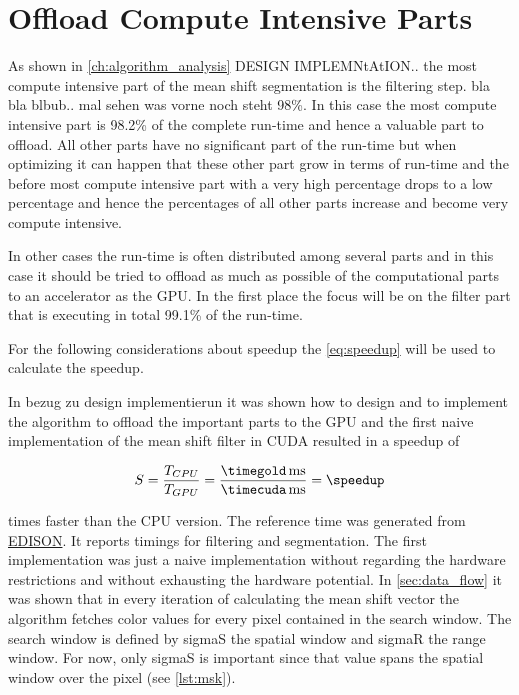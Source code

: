 \section{Offload Compute Intensive Parts}
\label{sec:offload_intensive}
\fpDiv{\speedup}{\timegold}{\timecuda}

As shown in \autoref{ch:algorithm_analysis} {\color{red} DESIGN IMPLEMNtAtION..}
the most compute intensive part of the mean shift segmentation is the filtering
step. bla bla blbub.. mal sehen was vorne noch steht 98\%. In this case the most
compute intensive part is 98.2\% of the complete run-time and hence a valuable
part to offload. All other parts have no significant part of the run-time but
when optimizing it can happen that these other part grow in terms of run-time
and the before most compute intensive part with a very high percentage drops to
a low percentage and hence the percentages of all other parts increase and
become very compute intensive. 

In other cases the run-time is often distributed among several parts and in this
case it should be tried to offload as much as possible of the computational parts
to an accelerator as the \gls{GPU}. In the first place the focus will be on the
filter part that is executing in total 99.1\% of the run-time.

For the following considerations about speedup the \autoref{eq:speedup} will be
used to calculate the speedup. 

In {\color{red} bezug zu design implementierun} it was shown how to design and
to implement the algorithm to offload the important parts to the \gls{GPU} and
the first naive implementation of the mean shift filter in \gls{CUDA} resulted
in a speedup of

\begin{equation*}\label{eq:speedup0}
	S = \frac{T_{CPU}}{T_{GPU}} = %
	\frac{\unit[\timegold]{ms}}{\unit[\timecuda]{ms}} = \speedup
\end{equation*}

times faster than the \gls{CPU} version. The reference time was generated from
\href{http://www.caip.rutgers.edu/riul/research/code.html}{ \gls{EDISON}}. It
reports timings for filtering and segmentation.
The first implementation was just a naive implementation without regarding the
hardware restrictions and without exhausting the hardware potential. In
\autoref{sec:data_flow} it was shown that in every iteration of calculating the
mean shift vector the algorithm fetches color values for every pixel contained
in the search window. The search window is defined by \textsf{sigmaS} the
spatial window and \textsf{sigmaR} the range window. For now, only
\textsf{sigmaS} is important since that value spans the spatial window over
the pixel (see \autoref{lst:msk}). 



